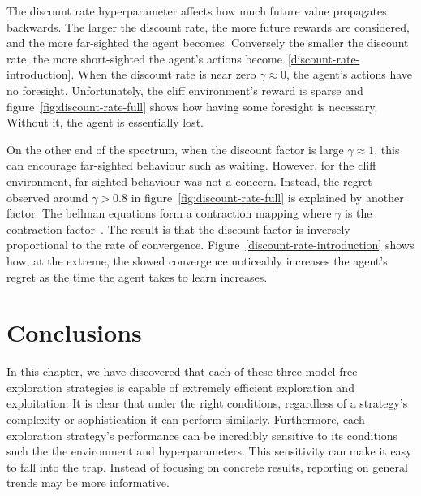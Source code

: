 \documentclass[]{final_report}
\begin{document}
  
  

The discount rate hyperparameter affects how much future value propagates backwards. The larger the discount rate, the more future rewards are considered, and the more far-sighted the agent becomes. Conversely the smaller the discount rate, the more short-sighted the agent's actions become~\ref{discount-rate-introduction}. When the discount rate is near zero $\gamma \approx 0$, the agent's actions have no foresight. Unfortunately, the cliff environment's reward is sparse and figure~\ref{fig:discount-rate-full} shows how having some foresight is necessary. Without it, the agent is essentially lost. 

On the other end of the spectrum, when the discount factor is large $\gamma \approx 1$, this can encourage far-sighted behaviour such as waiting. However, for the cliff environment, far-sighted behaviour was not a concern. Instead, the regret observed around $\gamma > 0.8$ in figure~\ref{fig:discount-rate-full} is explained by another factor. The bellman equations form a contraction mapping where $\gamma$ is the contraction factor~\cite{QlearningConvergance}. The result is that the discount factor is inversely proportional to the rate of convergence. Figure~\ref{discount-rate-introduction} shows how, at the extreme, the slowed convergence noticeably increases the agent's regret as the time the agent takes to learn increases.
\newpage
\section{Conclusions}

In this chapter, we have discovered that each of these three model-free exploration strategies is capable of extremely efficient exploration and exploitation. It is clear that under the right conditions, regardless of a strategy's complexity or sophistication it can perform similarly. Furthermore, each exploration strategy's performance can be incredibly sensitive to its conditions such the the environment and hyperparameters. This sensitivity can make it easy to fall into the  trap. Instead of focusing on concrete results, reporting on general trends may be more informative. 
\end{document}
